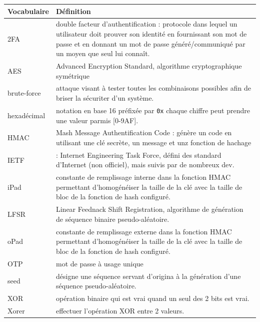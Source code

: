 \documentclass[a4paper, 10pt]{article}
\newcommand{\otp}{\textsc{OTP} }
\begin{document}
\begin{center}
    \begin{tabular}{|m{3cm}|m{8cm}|}
        \hline
        \textbf{Vocabulaire} & \textbf{Définition} \\
        \hline
        2FA & double facteur d'authentification : protocole dans lequel un utilisateur doit prouver son identité en fournissant son mot de passe et en donnant un mot de passe généré/communiqué par un moyen que seul lui connaît. \\
         \hline
        AES & Advanced Encryption Standard, algorithme cryptographique symétrique \\
        \hline
        brute-force & attaque visant à tester toutes les combinaisons possibles afin de briser la sécuriter d'un système.\\
        \hline
        hexadécimal & notation en base 16 préfixée par \texttt{0x} chaque chiffre peut prendre une valeur parmis [0-9AF].\\ 
       \hline
        HMAC & Mash Message Authentification Code : génère un code en utilisant une clé secrète, un message et unz fonction de hachage \\
         \hline
        IETF & : Internet Engineering Task Force, défini des standard d’Internet (non officiel), mais suivis par de nombreux dev.\\
        \hline
        iPad & constante de remplissage interne dans la fonction HMAC permettant d'homogénéiser la taille de la clé avec la taille de bloc de la fonction de hash configuré.\\
         \hline
        LFSR & Linear Feednack Shift Registration, algorithme de génération de séquence binaire pseudo-aléatoire. \\
       \hline
        oPad & constante de remplissage externe dans la fonction HMAC permettant d'homogénéiser la taille de la clé avec la taille de bloc de la fonction de hash configuré. \\
       \hline
        \otp & mot de passe à usage unique \\
        \hline
        seed & désigne une séquence servant d'origina à la génération d'une séquence pseudo-aléatoire.\\
       \hline
        XOR & opération binaire qui est vrai quand un seul des 2 bits est vrai.\\
        \hline
        Xorer & effectuer l'opération XOR entre 2 valeurs.\\
        \hline
    \end{tabular}
\end{center}
\end{document}
